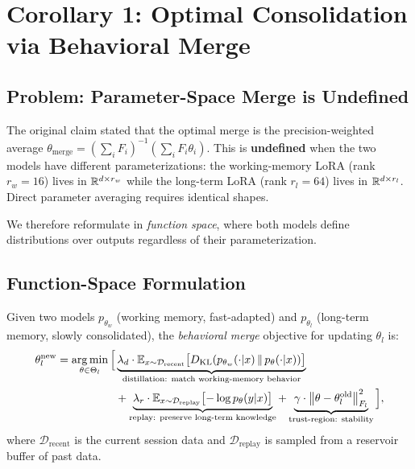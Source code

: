 \section{Corollary 1: Optimal Consolidation via Behavioral Merge}
\label{sec:cor1}

\subsection{Problem: Parameter-Space Merge is Undefined}

\begin{remark}
\label{rem:rank-mismatch}
The original claim stated that the optimal merge is the precision-weighted
average $\theta_{\mathrm{merge}} = (\sum_i F_i)^{-1}(\sum_i F_i\theta_i)$.
This is \textbf{undefined} when the two models have different
parameterizations: the working-memory LoRA (rank $r_w = 16$) lives in
$\mathbb{R}^{d \times r_w}$ while the long-term LoRA (rank $r_l = 64$) lives
in $\mathbb{R}^{d \times r_l}$. Direct parameter averaging requires identical
shapes.

We therefore reformulate in \emph{function space}, where both models
define distributions over outputs regardless of their parameterization.
\end{remark}

\subsection{Function-Space Formulation}

\begin{definition}
\label{def:behavioral-merge}
Given two models $p_{\theta_w}$ (working memory, fast-adapted) and
$p_{\theta_l}$ (long-term memory, slowly consolidated), the
\emph{behavioral merge} objective for updating $\theta_l$ is:
\begin{align}
  \theta_l^{\mathrm{new}} = \operatorname*{arg\,min}_{\theta \in \Theta_l}
  \Big[
    &\underbrace{\lambda_d \cdot \mathbb{E}_{x \sim \mathcal{D}_{\mathrm{recent}}}
    \bigl[D_{\mathrm{KL}}(p_{\theta_w}(\cdot|x) \,\|\, p_\theta(\cdot|x))\bigr]
    }_{\text{distillation: match working-memory behavior}}
    \notag \\
    &+ \underbrace{\lambda_r \cdot \mathbb{E}_{x \sim \mathcal{D}_{\mathrm{replay}}}
    \bigl[-\log p_\theta(y|x)\bigr]
    }_{\text{replay: preserve long-term knowledge}}
    + \underbrace{\gamma \cdot \left\|\theta - \theta_l^{\mathrm{old}}\right\|_{F_l}^2
    }_{\text{trust-region: stability}}
  \Big],
  \label{eq:behavioral-merge}
\end{align}
where $\mathcal{D}_{\mathrm{recent}}$ is the current session data and
$\mathcal{D}_{\mathrm{replay}}$ is sampled from a reservoir buffer of
past data.
\end{definition}

